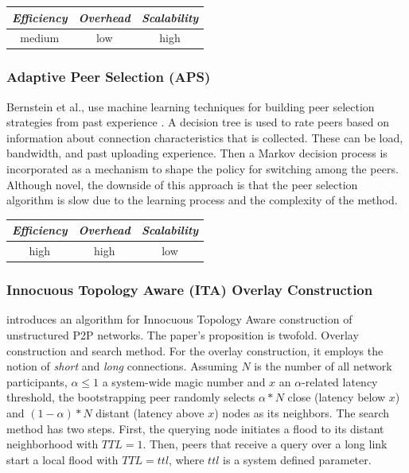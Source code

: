 \begin{center}
\begin{tabular}{ccc}
\emph{Efficiency} & \emph{Overhead} & \emph{Scalability} \\
\hline
medium &
low &
high
\end{tabular}
\end{center}

\subsubsection{Adaptive Peer Selection (APS)}
Bernstein et al., use machine learning techniques for building peer
selection strategies from past experience \cite{BFLZ2003}. A decision tree is
used to rate peers based on information about connection characteristics that is
collected. These can be load, bandwidth, and past uploading experience. Then a
Markov decision process is incorporated as a mechanism to shape the policy
for switching among the peers. Although novel, the downside of this approach is that the peer
selection algorithm is slow due to the learning process and the complexity of
the method.

\begin{center}
\begin{tabular}{ccc}
\emph{Efficiency} & \emph{Overhead} & \emph{Scalability} \\
\hline
high &
high &
%
low
\end{tabular}
\end{center}

\subsubsection{Innocuous Topology Aware (ITA) Overlay Construction}
\cite{PRFM2009} introduces an algorithm for Innocuous Topology Aware
construction of unstructured P2P networks. The paper's proposition is twofold.
Overlay construction and search method. For the overlay construction, it employs
the notion of \emph{short} and \emph{long} connections. Assuming $N$ is the
number of all network participants, $\alpha \leq 1 $ a system-wide magic number
and $x$ an $\alpha$-related latency threshold, the bootstrapping peer randomly
selects $\alpha \ast N$ close (latency below $x$) and
$\left( 1 - \alpha \right) \ast N$ distant (latency above $x$) nodes as its
neighbors. The search method has two steps. First, the querying node initiates a
flood to its distant neighborhood with $TTL = 1$. Then, peers that receive a
query over a long link start a local flood with $TTL = ttl$, where $ttl$ is a
system defined parameter.

